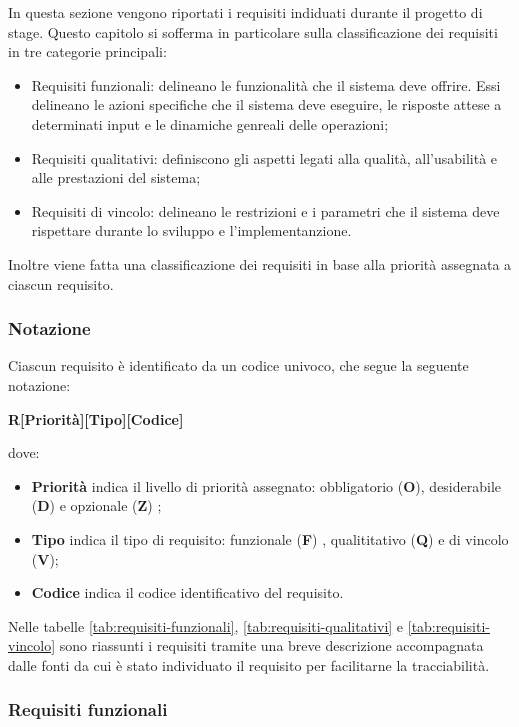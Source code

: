 In questa sezione vengono riportati i requisiti indiduati durante il progetto di stage.
Questo capitolo si sofferma in particolare sulla classificazione dei requisiti in tre categorie principali:
\begin{itemize}
    \item Requisiti funzionali: delineano le funzionalità che il sistema deve offrire. Essi delineano le azioni specifiche che il sistema deve eseguire, le risposte attese a determinati input e le dinamiche genreali delle operazioni;
    \item Requisiti qualitativi: definiscono gli aspetti legati alla qualità, all'usabilità e alle prestazioni del sistema;
    \item Requisiti di vincolo: delineano le restrizioni e i parametri che il sistema deve rispettare durante lo sviluppo e l'implementanzione. 
\end{itemize}

Inoltre viene fatta una classificazione dei requisiti in base alla priorità assegnata a ciascun requisito.

\subsubsection{Notazione}
Ciascun requisito è identificato da un codice univoco, che segue la seguente notazione:
\begin{center}
    \textbf{R[Priorità][Tipo][Codice]}
  \end{center}
  dove:
  \begin{itemize}
  \item \textbf{Priorità} indica il livello di priorità assegnato: obbligatorio (\textbf{O}), desiderabile (\textbf{D}) e opzionale (\textbf{Z}) ;
  \item \textbf{Tipo} indica il tipo di requisito: funzionale (\textbf{F}) , qualititativo (\textbf{Q}) e di vincolo (\textbf{V});
  \item \textbf{Codice} indica il codice identificativo del requisito.
  \end{itemize}

Nelle tabelle \ref{tab:requisiti-funzionali}, \ref{tab:requisiti-qualitativi} e \ref{tab:requisiti-vincolo} sono riassunti i requisiti tramite una breve descrizione accompagnata dalle fonti da cui è stato individuato il requisito per
facilitarne la tracciabilità. 


\subsubsection{Requisiti funzionali}

